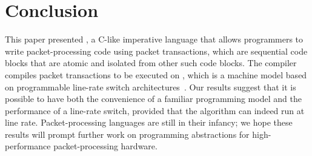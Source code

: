 \section{Conclusion}
\label{s:conclusion}
This paper presented \pktlanguage, a C-like imperative language that allows
programmers to write packet-processing code using packet transactions, which
are sequential code blocks that are atomic and isolated from other such code
blocks. The \pktlanguage compiler compiles packet transactions to be executed
on \absmachine, which is a machine model based on programmable line-rate switch
architectures~\cite{flexpipe, xpliant, tofino}. Our results suggest that it is
possible to have both the convenience of a familiar programming model and the
performance of a line-rate switch, provided that the algorithm can indeed run
at line rate.  Packet-processing languages are still in their infancy; we hope
these results will prompt further work on programming abstractions for
high-performance packet-processing hardware.
